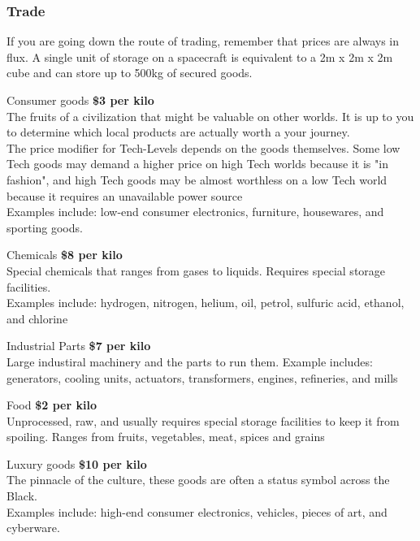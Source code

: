 \subsubsection{Trade}

If you are going down the route of trading, remember that prices are always in flux. A single unit of storage on a spacecraft is equivalent to a 2m x 2m x 2m cube and can store up to 500kg of secured goods.

\begin{genericsection}{Consumer goods}
\textbf{\$3 per kilo}\\
The fruits of a civilization that might be valuable on other worlds. It is up to you to determine which local products are actually worth a your journey.\\
The price modifier for Tech-Levels depends on the goods themselves. Some low Tech goods may demand a higher price on high Tech worlds because it is "in fashion", and high Tech goods may be almost worthless on a low Tech world because it requires an unavailable power source\\
Examples include: low-end consumer electronics, furniture, housewares, and sporting goods.
\end{genericsection}

\begin{genericsection}{Chemicals}
\textbf{\$8 per kilo}\\
Special chemicals that ranges from gases to liquids. Requires special storage facilities.\\
Examples include: hydrogen, nitrogen, helium, oil, petrol, sulfuric acid, ethanol, and chlorine
\end{genericsection}

\begin{genericsection}{Industrial Parts}
\textbf{\$7 per kilo}\\
Large industiral machinery and the parts to run them. Example includes: generators, cooling units, actuators, transformers, engines, refineries, and mills
\end{genericsection}

\begin{genericsection}{Food}
\textbf{\$2 per kilo}\\
Unprocessed, raw, and usually requires special storage facilities to keep it from spoiling. Ranges from fruits, vegetables, meat, spices and grains
\end{genericsection}

\begin{genericsection}{Luxury goods}
\textbf{\$10 per kilo}\\
The pinnacle of the culture, these goods are often a status symbol across the Black.\\
Examples include: high-end consumer electronics, vehicles, pieces of art, and cyberware.
\end{genericsection}

